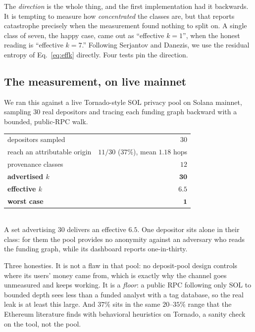 \documentclass[11pt]{article}
\begin{document}
The \emph{direction} is the whole thing, and the first implementation had it backwards.
It is tempting to measure how \emph{concentrated} the classes are, but that reports
catastrophe precisely when the measurement found nothing to split on. A single class of
seven, the happy case, came out as ``effective $k=1$'', when the honest reading is
``effective $k=7$.'' Following Serjantov and Danezis, we use the residual entropy of
Eq.~\ref{eq:effk} directly. Four tests pin the direction.

\subsection{The measurement, on live mainnet}

We ran this against a live Tornado-style SOL privacy pool on Solana mainnet, sampling
$30$ real depositors and tracing each funding graph backward with a bounded, public-RPC
walk.

\begin{measured}
\centering
\begin{tabular}{lr}
\toprule
depositors sampled & $30$ \\
reach an attributable origin & $11/30$ ($37\%$), mean $1.18$ hops \\
provenance classes & $12$ \\
\textbf{advertised $k$} & $\mathbf{30}$ \\
\textbf{effective $k$} & $\mathbf{6.5}$ \\
\textbf{worst case} & $\mathbf{1}$ \\
\bottomrule
\end{tabular}\\[0.3em]
{\footnotesize A set advertising $30$ delivers an effective $6.5$. One depositor sits
alone in their class: for them the pool provides no anonymity against an adversary who
reads the funding graph, while its dashboard reports one-in-thirty.}
\end{measured}

Three honesties. It is not a flaw in that pool: no deposit-pool design controls where
its users' money came from, which is exactly why the channel goes unmeasured and keeps
working. It is a \emph{floor}: a public RPC following only SOL to bounded depth sees less
than a funded analyst with a tag database, so the real leak is at least this large. And
$37\%$ sits in the same $20$--$35\%$ range that the Ethereum literature \cite{crosschain}
finds with behavioral heuristics on Tornado, a sanity check on the tool, not the pool.
\end{document}

